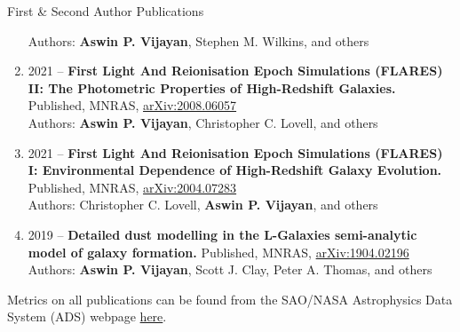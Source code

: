 \documentclass[a4paper,10pt]{resume} %
\begin{document}
\begin{rSection}{First \& Second Author Publications}
\begin{enumerate}
    Authors: \textbf{Aswin P. Vijayan}, Stephen M. Wilkins, and others
    \item {2021 -- \bf First Light And Reionisation Epoch Simulations (FLARES) II: The Photometric Properties of High-Redshift Galaxies.} Published, MNRAS, \href{https://arxiv.org/abs/2008.06057}{\color{blue}arXiv:2008.06057}\\
    Authors: \textbf{Aswin P. Vijayan}, Christopher C. Lovell, and others
    \item {2021 -- \bf First Light And Reionisation Epoch Simulations (FLARES) I: Environmental Dependence of High-Redshift Galaxy Evolution.} Published, MNRAS, \href{https://ui.adsabs.harvard.edu/abs/2020MNRAS.tmp.3168L/abstract}{\color{blue}arXiv:2004.07283}\\
    Authors: Christopher C. Lovell, \textbf{Aswin P. Vijayan}, and others
    \item {2019 -- \bf Detailed dust modelling in the L-Galaxies semi-analytic model of galaxy formation.} Published, MNRAS, \href{https://ui.adsabs.harvard.edu/abs/2019MNRAS.489.4072V/abstract}{\color{blue}arXiv:1904.02196}\\
    Authors: \textbf{Aswin P. Vijayan}, Scott J. Clay, Peter A. Thomas, and others
\end{enumerate}
Metrics on all publications can be found from the SAO/NASA Astrophysics Data System (ADS) webpage 
\href{https://ui.adsabs.harvard.edu/public-libraries/nx11cjS2ROuxirheKfVAYw}{\color{blue}here}.
\end{rSection} 
\end{document}
